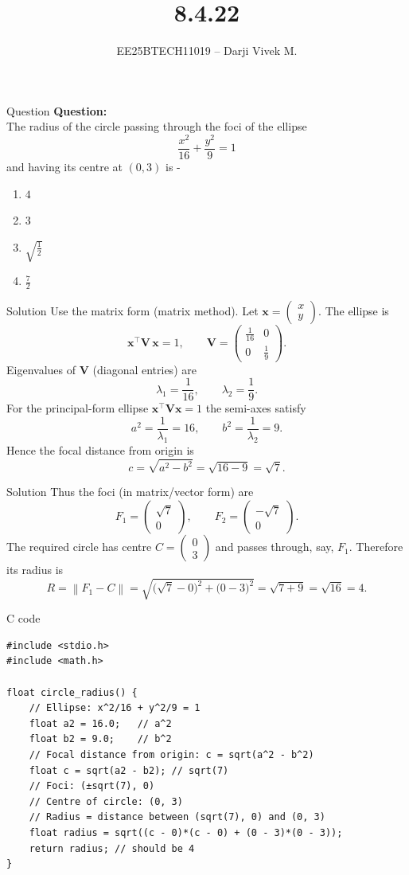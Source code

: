 \documentclass{beamer}
\title{8.4.22}
\author{EE25BTECH11019 -- Darji Vivek M.}
\date{}
\newcommand{\myvec}[1]{\begin{pmatrix}#1\end{pmatrix}}
\renewcommand{\vec}[1]{\mathbf{#1}}
\begin{document}
\begin{frame}
\begin{titlepage}

\end{titlepage}
\end{frame}
\begin{frame}{Question}
\textbf{Question:}\\[2pt]
The radius of the circle passing through the foci of the ellipse
\[
\frac{x^2}{16}+\frac{y^2}{9}=1
\]
and having its centre at $(0,3)$ is -\\[6pt]
\begin{enumerate}
    \item $4$
    \item $3$
    \item $\sqrt{\frac{1}{2}}$
    \item $\frac{7}{2}$
\end{enumerate}
\end{frame}

\begin{frame}{Solution}
Use the matrix form (matrix method). Let $\vec{x}=\myvec{x\\[2pt]y}$. The ellipse is
\[
\vec{x}^\top \vec{V}\,\vec{x}=1,\qquad
\vec{V}=\myvec{\frac{1}{16} & 0\\[2pt]0 & \frac{1}{9}}.
\]
Eigenvalues of $\vec{V}$ (diagonal entries) are
\[
\lambda_1=\frac{1}{16},\qquad \lambda_2=\frac{1}{9}.
\]
For the principal-form ellipse $\vec{x}^\top\vec{V}\vec{x}=1$ the semi-axes satisfy
\[
a^2=\frac{1}{\lambda_1}=16,\qquad b^2=\frac{1}{\lambda_2}=9.
\]
Hence the focal distance from origin is
\[
c=\sqrt{a^2-b^2}=\sqrt{16-9}=\sqrt{7}.
\]
\end{frame}
\begin{frame}{Solution}
Thus the foci (in matrix/vector form) are
\[
F_1=\myvec{\sqrt{7}\\[2pt]0},\qquad F_2=\myvec{-\sqrt{7}\\[2pt]0}.
\]
The required circle has centre $C=\myvec{0\\[2pt]3}$ and passes through, say, $F_1$. Therefore its radius is
\[
R=\left\|{F_1-C}\right\|
=\sqrt{\bigl(\sqrt{7}-0\bigr)^2+\bigl(0-3\bigr)^2}
=\sqrt{7+9}
=\sqrt{16}
=\boxed{4}.
\]
\end{frame}
\begin{frame}[fragile]{C code}
\begin{lstlisting}
#include <stdio.h>
#include <math.h>

float circle_radius() {
    // Ellipse: x^2/16 + y^2/9 = 1
    float a2 = 16.0;   // a^2
    float b2 = 9.0;    // b^2
    // Focal distance from origin: c = sqrt(a^2 - b^2)
    float c = sqrt(a2 - b2); // sqrt(7)
    // Foci: (±sqrt(7), 0)
    // Centre of circle: (0, 3)
    // Radius = distance between (sqrt(7), 0) and (0, 3)
    float radius = sqrt((c - 0)*(c - 0) + (0 - 3)*(0 - 3));
    return radius; // should be 4
}

\end{lstlisting}
\end{frame}
\end{document}
